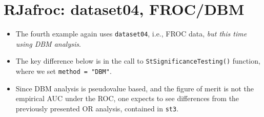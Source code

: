 \documentclass[
]{book}
\providecommand{\tightlist}{%
  \setlength{\itemsep}{0pt}\setlength{\parskip}{0pt}}
\begin{document}
\hypertarget{ORApplications-dataset04-FROC-DBM-RJafroc}{%
\section{RJafroc: dataset04, FROC/DBM}\label{ORApplications-dataset04-FROC-DBM-RJafroc}}

\begin{itemize}
\tightlist
\item
  The fourth example again uses \texttt{dataset04}, i.e., FROC data, \emph{but this time using DBM analysis}.
\item
  The key difference below is in the call to \texttt{StSignificanceTesting()} function, where we set \texttt{method\ =\ "DBM"}.
\item
  Since DBM analysis is pseudovalue based, and the figure of merit is not the empirical AUC under the ROC, one expects to see differences from the previously presented OR analysis, contained in \texttt{st3}.
\end{itemize}
\end{document}
